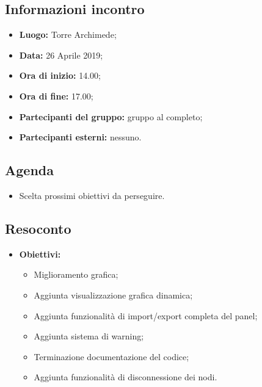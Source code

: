 \subsection{Informazioni incontro}
\begin{itemize}
	\item { \textbf{Luogo:} Torre Archimede};
	\item { \textbf{Data:} 26 Aprile 2019};
	\item { \textbf{Ora di inizio:} 14.00};
	\item { \textbf{Ora di fine:} 17.00};
	\item { \textbf{Partecipanti del gruppo:} gruppo al completo};
	\item { \textbf{Partecipanti esterni:} nessuno}.
\end{itemize}


\subsection{Agenda}
\begin{itemize}
	\item {Scelta prossimi obiettivi da perseguire.}
\end{itemize}

\subsection{Resoconto}
\begin{itemize}
	\item { \textbf{Obiettivi:}
	\begin{itemize}
		\item Miglioramento grafica;
		\item Aggiunta visualizzazione grafica dinamica;
		\item Aggiunta funzionalità di import/export completa del panel;
		\item Aggiunta sistema di warning;
		\item Terminazione documentazione del codice;
		\item Aggiunta funzionalità di disconnessione dei nodi.
	\end{itemize}}	
\end{itemize}

